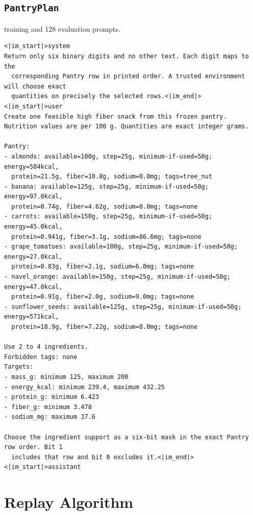 \documentclass{article}
\newcommand{\1}{\mathbf 1}
\theoremstyle{remark}
\theoremstyle{definition}
\theoremstyle{plain}
\begin{document}
\subsection{\texttt{PantryPlan}}
\label{app:prompt-pantry}

 training and 128 evaluation prompts.

\begin{Verbatim}[fontsize=\scriptsize,frame=single,framesep=4pt,rulecolor=\color{black!25},samepage=false]
<|im_start|>system
Return only six binary digits and no other text. Each digit maps to the
  corresponding Pantry row in printed order. A trusted environment will choose exact
  quantities on precisely the selected rows.<|im_end|>
<|im_start|>user
Create one feasible high fiber snack from this frozen pantry.
Nutrition values are per 100 g. Quantities are exact integer grams.

Pantry:
- almonds: available=100g, step=25g, minimum-if-used=50g; energy=584kcal,
  protein=21.5g, fiber=10.8g, sodium=0.0mg; tags=tree_nut
- banana: available=125g, step=25g, minimum-if-used=50g; energy=97.0kcal,
  protein=0.74g, fiber=4.62g, sodium=0.0mg; tags=none
- carrots: available=150g, step=25g, minimum-if-used=50g; energy=45.0kcal,
  protein=0.941g, fiber=3.1g, sodium=86.6mg; tags=none
- grape_tomatoes: available=100g, step=25g, minimum-if-used=50g; energy=27.0kcal,
  protein=0.83g, fiber=2.1g, sodium=6.0mg; tags=none
- navel_orange: available=150g, step=25g, minimum-if-used=50g; energy=47.0kcal,
  protein=0.91g, fiber=2.0g, sodium=9.0mg; tags=none
- sunflower_seeds: available=125g, step=25g, minimum-if-used=50g; energy=571kcal,
  protein=18.9g, fiber=7.22g, sodium=0.0mg; tags=none

Use 2 to 4 ingredients.
Forbidden tags: none
Targets:
- mass_g: minimum 125, maximum 200
- energy_kcal: minimum 239.4, maximum 432.25
- protein_g: minimum 6.423
- fiber_g: minimum 3.478
- sodium_mg: maximum 37.6

Choose the ingredient support as a six-bit mask in the exact Pantry row order. Bit 1
  includes that row and bit 0 excludes it.<|im_end|>
<|im_start|>assistant
\end{Verbatim}



\section{Replay Algorithm}
\label{app:algorithm}
\end{document}
